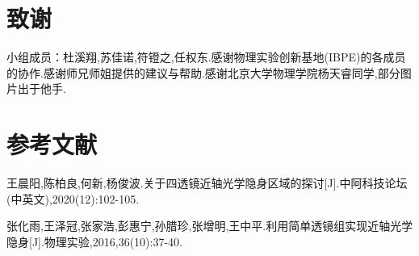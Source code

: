 \documentclass[UTF8]{gapd}
\begin{document}
\section*{致谢}
小组成员：杜溪翔,苏佳诺,符镫之,任权东.感谢物理实验创新基地(IBPE)的各成员的协作.感谢师兄师姐提供的建议与帮助.感谢北京大学物理学院杨天睿同学,部分图片出于他手.




\section*{参考文献}
\begin{thebibliography}{2}

王晨阳,陈柏良,何新,杨俊波.关于四透镜近轴光学隐身区域的探讨[J].中阿科技论坛(中英文),2020(12):102-105.

张化雨,王泽冠,张家浩,彭惠宁,孙腊珍,张增明,王中平.利用简单透镜组实现近轴光学隐身[J].物理实验,2016,36(10):37-40.

\end{thebibliography}

\end{document}
